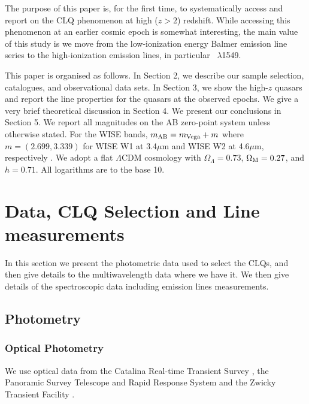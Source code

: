 \documentclass[fleqn,usenatbib]{mnras}
\begin{document}
The purpose of this paper is, for the first time, to systematically
access and report on the CLQ phenomenon at high ($z>2$)
redshift. While accessing this phenomenon at an earlier cosmic epoch
is somewhat interesting, the main value of this study is we move from
the low-ionization energy Balmer emission line series to the
high-ionization emission lines, in particular \civ\ $\lambda$1549.

This paper is organised as follows. In Section 2, we describe our
sample selection, catalogues, and observational data sets.  In Section
3, we show the high-$z$ quasars and report the line properties for the
quasars at the observed epochs.  We give a very brief theoretical
discussion in Section 4. We present our conclusions in Section 5.  We
report all magnitudes on the AB zero-point system \citep{Oke_Gunn1983,
Fukugita1996} unless otherwise stated. For the WISE bands, $m_{\rm AB}
= m_{\rm Vega} + m$ where $m = (2.699, 3.339)$ for WISE W1 at
3.4$\mu$m and WISE W2 at 4.6$\mu$m, respectively \citep{Cutri2011,
Cutri2013}. We adopt a flat $\Lambda$CDM cosmology with
$\Omega_{\Lambda} = 0.73 $, $\Omega_{\rm M} = 0.27$, and $h =
0.71$. All logarithms are to the base 10.


\section{Data, CLQ Selection and Line measurements}
In this section we present the photometric data used to select the
CLQs, and then give details to the multiwavelength data where we have
it. We then give details of the spectroscopic data including emission
lines measurements.

\subsection{Photometry}
\subsubsection{Optical Photometry}
We use optical data from the Catalina Real-time Transient Survey
\citep[CRTS;][]{Drake2009, Mahabal2011}, the Panoramic Survey
Telescope and Rapid Response System \citep[PanSTARRS;][]{Kaiser2010,
Stubbs2010, Tonry2012, Magnier2013} and the Zwicky Transient Facility
\citep[ZTF;][]{Bellm2019_ZTFOverview}. 
\end{document}
